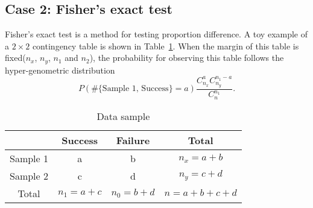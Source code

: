 \documentclass[a4paper,12pt]{article}
\begin{document}
\subsection{Case 2: Fisher's exact test}
\label{sec:case-2:-fishers}

Fisher's exact test is a method for testing proportion difference. A toy example of a $2\times 2$ contingency table is shown in Table~\ref{tab:data_sample}. When the margin of this table is fixed($n_x$, $n_y$, $n_1$ and $n_2$), the probability for observing this table follows the hyper-genometric distribution
\[
  P\left(
    \#\{\text{Sample 1, Success}\} = a
  \right)
  \frac{
    C_{n_x}^aC_{n_y}^{n_1 - a}
  }{
    C_n^{n_1}
  }
  .
\]

\begin{table}[htbp]
  \centering
  \begin{tabular}{c|c|c|c}
    \hline
    & Success & Failure & Total    \\
    \hline
    Sample 1 & a & b & $n_x = a + b$    \\
    \hline
    Sample 2 & c & d & $n_y = c + d$     \\
    \hline
    Total & $n_1 = a + c$ & $n_0 = b + d$ & $n = a + b + c + d$    \\
    \hline                          
  \end{tabular}
  \caption{Data sample}
  \label{tab:data_sample}
\end{table}
\end{document}
